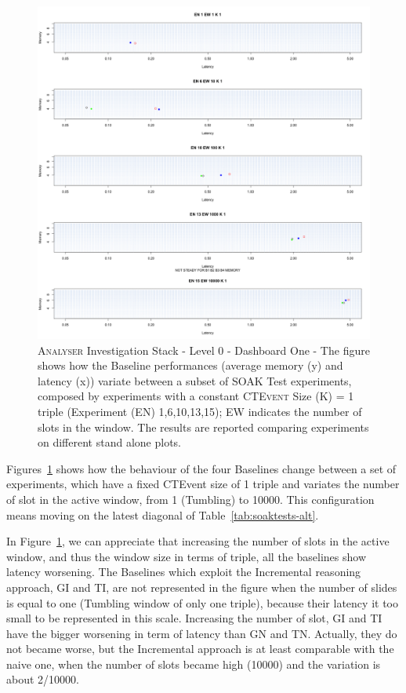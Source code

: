 \begin{figure}[t!hb]
	\centering
	\includegraphics[width=\linewidth]{images/dashboard-1-split}	
	\caption[\textsc{Analyser} Investigation Stack - Level 0 - Dashboard One - Split Version]{\textsc{Analyser} Investigation Stack - Level 0 - Dashboard One - The figure shows how the Baseline performances (average memory (y) and latency (x))  variate between a subset of SOAK Test experiments, composed by experiments with a constant \textsc{CTEvent} Size (K) = 1 triple (Experiment (EN) 1,6,10,13,15); EW indicates the number of slots in the window. The results are reported comparing experiments on different stand alone plots.} 
	\label{fig:result_dashboard_ka}
\end{figure}

Figures~\ref{fig:result_dashboard_ka} shows how the behaviour of the four Baselines change between a set of experiments, which have a fixed CTEvent size of 1 triple and variates the number of slot in the active window, from 1 (Tumbling) to 10000. This configuration means moving on the latest diagonal of Table~\ref{tab:soaktests-alt}.

In Figure~\ref{fig:result_dashboard_ka}, we can appreciate that increasing the number of slots in the active window, and thus the window size in terms of triple, all the baselines show latency worsening. The Baselines which exploit the Incremental reasoning approach, GI and TI, are not represented in the figure when the number of slides is equal to one (Tumbling window of only one triple), because their latency it too small to be represented in this scale. Increasing the number of slot, GI and TI have the bigger worsening in term of latency than GN and TN. Actually, they do not became worse, but the Incremental approach is at least comparable with the naive one, when the number of slots became high (10000) and the variation is about 2/10000.


